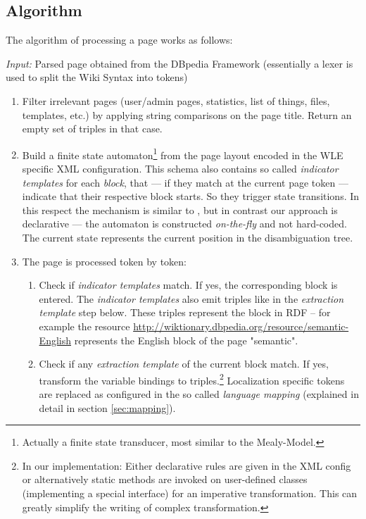 \subsection{Algorithm}
The algorithm of processing a page works as follows:

\textit{Input:} Parsed page obtained from the DBpedia Framework (essentially a lexer is used to split the Wiki Syntax into tokens)
\begin{enumerate}
\item Filter irrelevant pages (user/admin pages, statistics, list of things, files, templates, etc.) by applying string comparisons on the page title. 
Return an empty set of triples in that case.
\item Build a finite state automaton\footnote{Actually a finite state transducer, most similar to the Mealy-Model.} from the page layout encoded in the WLE specific XML configuration. 
This schema also contains so called \textit{indicator templates} for each \textit{block}, that --- if they match at the current page token --- indicate that their respective block starts. 
So they trigger state transitions. 
In this respect the mechanism is similar to \cite{McCrae_2012}, but in contrast our approach is declarative --- the automaton is constructed \textit{on-the-fly} and not hard-coded. 
The current state represents the current position in the disambiguation tree.
\item The page is processed token by token:
\begin{enumerate}
\item Check if \textit{indicator templates} match. 
If yes, the corresponding block is entered. 
The \textit{indicator templates} also emit triples like in the \textit{extraction template} step below. 
These triples represent the block in RDF -- for example the resource \url{http://wiktionary.dbpedia.org/resource/semantic-English} represents the English block of the page "semantic".
\item Check if any \textit{extraction template} of the current block match.
\subitem If yes, transform the variable bindings to triples.\footnote{In our implementation: 
Either declarative rules are given in the XML config or alternatively static methods are invoked on user-defined classes (implementing a special interface) for an imperative transformation. This can greatly simplify the writing of complex transformation.} Localization specific tokens are replaced as configured in the so called \textit{language mapping} (explained in detail in section \ref{sec:mapping}).
\end{enumerate}

\end{enumerate}
